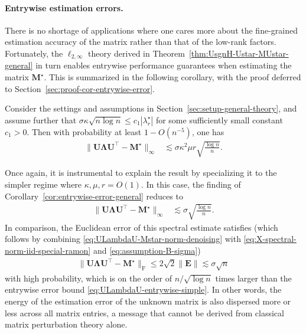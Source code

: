 \paragraph{Entrywise estimation errors.} There is no shortage of applications where one cares more about the fine-grained estimation accuracy of the matrix rather than that of the low-rank factors. Fortunately, the $\ell_{2,\infty}$ theory derived in  Theorem~\ref{thm:UsgnH-Ustar-MUstar-general} in turn enables entrywise performance guarantees when estimating the matrix $\bm{M}^{\star}$. This is summarized in the following corollary, with the proof deferred to Section~\ref{sec:proof-cor-entrywise-error}.
%
\begin{corollary}
	\label{cor:entrywise-error-general}
	Consider the settings and assumptions in Section~\ref{sec:setup-general-theory}, and assume  further that
	$\sigma \kappa \sqrt{n\log n} \leq c_1 |\lambda_r^{\star}|$ for some sufficiently small constant $c_1>0$. Then with probability at least $1-O(n^{-5})$, one has
	\begin{align}
		\big\|\bm{U}\bm{\Lambda}\bm{U}^{\top}-\bm{M}^{\star}\big\|_{\infty} & \lesssim\sigma\kappa^{2}\mu r\sqrt{\frac{\log n}{n}}.
	\end{align}
\end{corollary}
%
Once again, it is instrumental to explain the result by specializing it to the simpler regime where $\kappa, \mu, r =O(1)$.  In this case, the finding of Corollary~\ref{cor:entrywise-error-general} reduces to
%
\begin{align}
	\big\|\bm{U}\bm{\Lambda}\bm{U}^{\top}-\bm{M}^{\star}\big\|_{\infty} & \lesssim\sigma  \sqrt{\frac{\log n}{n}}.
	\label{eq:ULambdaU-entrywise-simple}
\end{align}
%
In comparison, the Euclidean error of this spectral estimate satisfies (which follows by combining \eqref{eq:ULambdaU-Mstar-norm-denoising} with \eqref{eq:X-spectral-norm-iid-special-ramon} and \eqref{eq:assumption-B-sigma})
%
\begin{align}
	\big\|\bm{U}\bm{\Lambda}\bm{U}^{\top}-\bm{M}^{\star}\big\|_{\mathrm{F}} \leq 2\sqrt{2} \|\bm{E}\| \lesssim \sigma\sqrt{n}
\end{align}
%
with high probability, which is on the order of $n/\sqrt{\log n}$ times larger than the entrywise error bound \eqref{eq:ULambdaU-entrywise-simple}. In other words, the energy of the estimation error of the unknown matrix is also dispersed more or less across all matrix entries, a message that cannot be derived from classical matrix perturbation theory alone.



